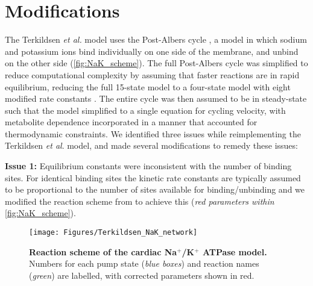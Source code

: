 \documentclass[11pt]{article}
\newcounter{num}
\begin{document}
\section{Modifications}
\label{sec:modifications}
The Terkildsen \textit{et al.} model uses the Post-Albers cycle \citep{apell_electrogenic_1989}, a model in which sodium and potassium ions bind individually on one side of the membrane, and unbind on the other side (\autoref{fig:NaK_scheme}). The full Post-Albers cycle was simplified to reduce computational complexity by assuming that faster reactions are in rapid equilibrium, reducing the full 15-state model to a four-state model with eight modified rate constants \citep{smith_development_2004}. The entire cycle was then assumed to be in steady-state such that the model simplified to a single equation for cycling velocity, with metabolite dependence incorporated in a manner that accounted for thermodynamic constraints. We identified three issues while reimplementing the Terkildsen \textit{et al}. model, and made several modifications to remedy these issues:

\textbf{Issue 1:} Equilibrium constants were inconsistent with the number of binding sites. For identical binding sites the kinetic rate constants are typically assumed to be proportional to the number of sites available for binding/unbinding \citep{keener_mathematical_2009} and we modified the reaction scheme from \citet{terkildsen_balance_2007} to achieve this (\textit{red parameters within} \autoref{fig:NaK_scheme}).

\begin{figure}
\centering
\texttt{[image: Figures/Terkildsen\_NaK\_network]}
\caption{\textbf{Reaction scheme of the cardiac Na$^+$/K$^+$ ATPase model.} Numbers for each pump state (\textit{blue boxes}) and reaction names (\textit{green}) are labelled, with corrected parameters shown in red.}
\label{fig:NaK_scheme}
\end{figure}
\end{document}
